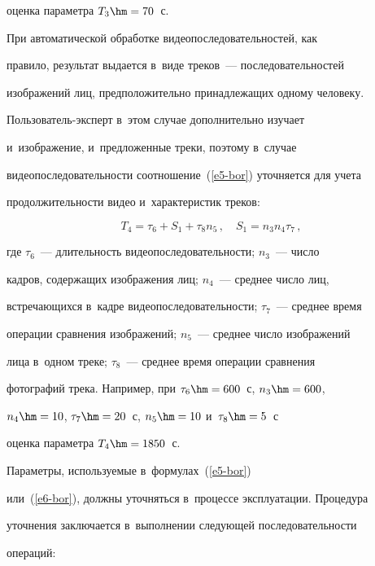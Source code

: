 оценка параметра $T_3\hm = 70$~с.





      При автоматической обработке видеопоследовательностей, как 


правило, результат выдается в~виде треков~--- последовательностей 


изображений лиц, предположительно принадлежащих одному человеку.  


Поль\-зо\-ва\-тель-экс\-перт в~этом случае дополнительно изучает 


и~изображение, и~предложенные треки, поэтому в~случае 


видеопоследовательности соотношение~(\ref{e5-bor}) уточняется для учета 


продолжительности видео и~характеристик треков:


      \begin{equation}


      T_4=\tau_6+S_1+\tau_8 n_5\,,\quad S_1=n_3 n_4 \tau_7\,,


      \label{e6-bor}


      \end{equation}


где $\tau_6$~--- длительность видеопоследовательности; $n_3$~--- число 


кадров, содержащих изображения лиц; $n_4$~--- среднее число лиц, 


встречающихся в~кадре видеопоследовательности; $\tau_7$~--- среднее время 


операции сравнения изображений; $n_5$~--- среднее число изображений 


лица в~одном треке; $\tau_8$~--- среднее время операции сравнения 


фотографий трека. Например, при $\tau_6\hm = 600$~с, $n_3\hm = 600$, 


$n_4\hm = 10$, $\tau_7\hm = 20$~с, $n_5\hm = 10$ и~$\tau_8\hm = 5$~с 


оценка параметра $T_4\hm = 1850$~с.





      Параметры, используемые в~формулах~(\ref{e5-bor})  


или~(\ref{e6-bor}), должны уточняться в~процессе эксплуатации. Процедура 


уточнения заключается в~выполнении следующей последовательности 


операций:


